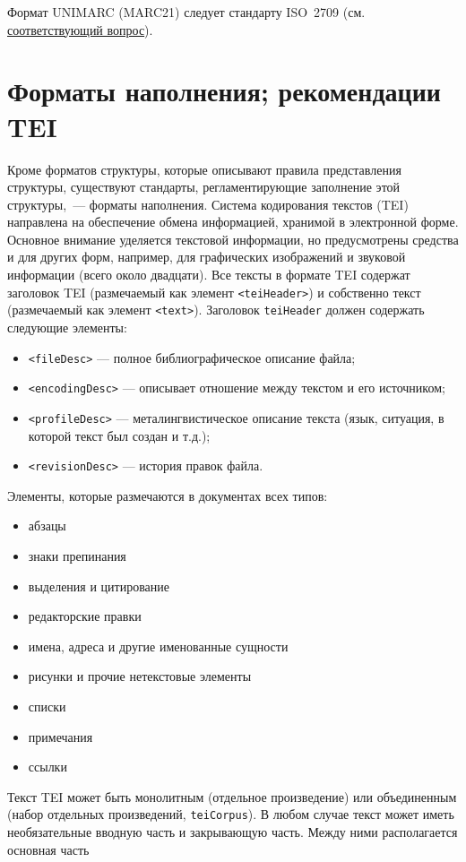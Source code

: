 \documentclass[12pt]{article}
\theoremstyle{definition}
\theoremstyle{remark}
\numberwithin{equation}{section}
\begin{document}
Формат UNIMARC (MARC21) следует стандарту ISO~2709 (см. \hyperref[subsec:ISO]{соответствующий вопрос}).

\section{Форматы наполнения; рекомендации TEI}
\label{sec:TEI}
Кроме форматов структуры, которые описывают правила представления структуры, существуют стандарты, регламентирующие заполнение этой структуры,~--- форматы наполнения.
Система кодирования текстов (TEI) направлена на обеспечение обмена информацией, хранимой
в электронной форме. Основное внимание уделяется текстовой информации, но предусмотрены средства и для других форм, например, для графических изображений и звуковой информации (всего около двадцати). Все тексты в формате TEI содержат заголовок TEI (размечаемый как элемент \texttt{<teiHeader>}) и собственно текст (размечаемый как элемент \texttt{<text>}). Заголовок \texttt{teiHeader} должен содержать следующие элементы:
\begin{itemize}
\item \texttt{<fileDesc>} --- полное библиографическое описание файла;
\item \texttt{<encodingDesc>} --- описывает отношение между текстом и его источником;
\item \texttt{<profileDesc>} --- металингвистическое описание текста (язык, ситуация, в которой текст был создан и т.д.);
\item \texttt{<revisionDesc>} --- история правок файла.
\end{itemize}
Элементы, которые размечаются в документах всех типов:
\begin{itemize}
\item абзацы
\item знаки препинания
\item выделения и цитирование
\item редакторские правки
\item имена, адреса и другие именованные сущности
\item рисунки и прочие нетекстовые элементы
\item списки
\item примечания
\item ссылки
\end{itemize}
Текст TEI может быть монолитным (отдельное произведение) или объединенным (набор
отдельных произведений, \texttt{teiCorpus}). В любом случае текст может иметь
необязательные вводную часть и закрывающую часть. Между ними располагается основная часть
\end{document}
